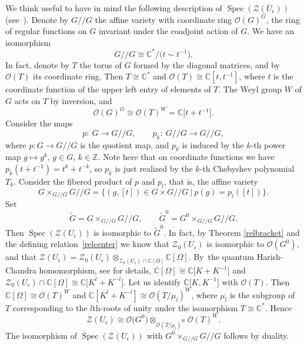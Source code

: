 \documentclass[pdftex]{sigma}%
\numberwithin{equation}{section}
\numberwithin{figure}{section}
\newcommand{\e}{\epsilon}
\newcommand{\mc}{\mathbb{C}}
\newcommand{\mz}{\mathbb{Z}}
\newcommand{\lra}{\longrightarrow}
\newcommand{\ra}{\rightarrow}
\begin{document}
\begin{remk}\label{tildeG}{\rm We think useful to have in mind the following description of $\operatorname{Spec}(\mathcal{Z}(U_\epsilon))$ (see~\cite{DC-K}). Denote by $G/\!/G$ the affine variety with coordinate ring $\mathcal{O}(G)^G$, the ring of regular functions on $G$ invariant under the coadjoint action of $G$. We have an isomorphism
\begin{equation*}%
G/\!/G \cong \mc^*/\big(t\sim t^{-1}\big).
\end{equation*}
In fact, denote by $T$ the torus of $G$ formed by the diagonal matrices, and by $\mathcal{O}(T)$ its coordinate ring. Then $T\cong \mc^*$ and $\mathcal{O}(T)\cong \mc[t,t^{-1}]$, where $t$ is the coordinate function of the upper left entry of elements of $T$. The Weyl group $W$ of $G$ acts on $T$ by inversion, and
\begin{equation*}%
\mathcal{O}(G)^G \cong \mathcal{O}(T)^W = \mc\big[t+t^{-1}\big].
\end{equation*}
 Consider the maps
\begin{equation*}%
 p\colon\ G\lra G/\!/G,\qquad p_k\colon\ G/\!/G \lra G/\!/G,
\end{equation*}
where $p\colon G\ra G/\!/G$ is the quotient map, and $p_k$ is induced by the $k$-th power map $g\mapsto g^k$, $g\in G$, $k\in \mz$. Note here that on coordinate functions we have $p_k(t+t^{-1}) = t^k+t^{-k}$, so $p_k$ is just realized by the $k$-th Chebyshev polynomial $T_k$. Consider the fibered product of $p$ and $p_l$, that is, the affine variety
\begin{equation*}%
G\times_{G/\!/G} G/\!/G= \{ (g,[t])\in G\times G/\!/G\ |\ p(g) = p_l([t])\}.
\end{equation*}
Set
\begin{equation*}%
\tilde G = G\times_{G/\!/G} G/\!/G,\qquad
\tilde G^0 = G^0\times_{G/\!/G} G/\!/G.
\end{equation*}
Then $\operatorname{Spec}(\mathcal{Z}(U_\epsilon))$ is isomorphic to $\tilde G^0$. In fact, by Theorem \ref{relbracket} and the defining relation~\eqref{relcenter} we know that $\mathcal{Z}_0(U_\epsilon)$ is isomorphic to $\mathcal{O}(G^0)$, and that $\mathcal{Z}(U_\epsilon) = \mathcal{Z}_0(U_\epsilon)\otimes_{\mathcal{Z}_0(U_\epsilon)\cap \mc[\Omega]} \mc[\Omega]$. By~the quantum Harish-Chandra homomorphism, see \cite{DC-K} for details, $\mc[\Omega]\cong \mc\big[K+K^{-1}\big]$ and $\mathcal{Z}_0(U_\epsilon) \cap \mc[\Omega] \cong \mc\big[K^l+K^{-l}\big]$. Let us identify $\mc\big[K,K^{- 1}\big]$ with $\mathcal{O}(T)$. Then $\mc[\Omega]\cong \mathcal{O}(T)^W$ and $\mc[K^l+K^{-l}]\cong \mathcal{O}(T/\mu_l)^W$, where $\mu_l$ is the subgroup of $T$ corresponding to the $l$th-roots of unity under the isomorphism $T\cong \mc^*$. Hence
\[\mathcal{Z}(U_\epsilon)\cong \mathcal{O}\big(G^0\big) \otimes_{\mathcal{O}(T/\mu_l)^W} \mathcal{O}(T)^W.\]
The isomorphism of $\operatorname{Spec}(\mathcal{Z}(U_\e))$ with $G^0 \times_{G/\!/G} G/\!/G$ follows by duality.}
\end{remk}
\end{document}
